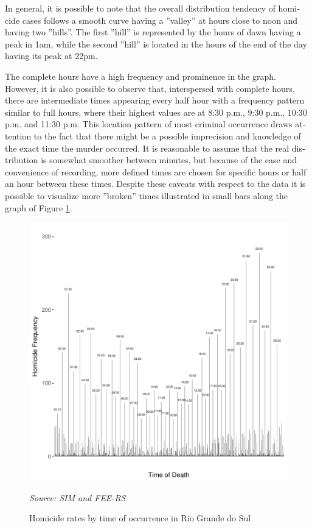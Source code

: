 \documentclass[12pt,openright,oneside,a4paper,english,french,spanish]{abntex2}
\numberwithin{table}{section} %
\numberwithin{figure}{section} %
\newcommand{\source}[1]{\textit{#1}}
\begin{document}
\begin{otherlanguage}{english}
In general, it is possible to note that the overall distribution tendency of homicide cases follows a smooth curve having a ''valley'' at hours close to noon and having two ''hills''. The first ''hill'' is represented by the hours of dawn having a peak in 1am, while the second ''hill'' is located in the hours of the end of the day having its peak at 22pm.

The complete hours have a high frequency and prominence in the graph. However, it is also possible to observe that, interspersed with complete hours, there are intermediate times appearing every half hour with a frequency pattern similar to full hours, where their highest values are at 8:30 p.m., 9:30 p.m., 10:30 p.m. and 11:30 p.m. This location pattern of most criminal occurrence draws attention to the fact that there might be a possible imprecision and knowledge of the exact time the murder occurred. It is reasonable to assume that the real distribution is somewhat smoother between minutes, but because of the ease and convenience of recording, more defined times are chosen for specific hours or half an hour between these times. Despite these caveats with respect to the data it is possible to visualize more ''broken'' times illustrated in small bars along the graph of Figure \ref{fig:horarios}.


\begin{figure}[H]
\begin{center}
\includegraphics{TESE_DE_DOUTORADO_RENAN_FINAL-plot4_HV}
\end{center}
\caption{Homicide rates by time of occurrence in Rio Grande do Sul}
\source{Source: SIM and FEE-RS}
\label{fig:horarios}
\end{figure}


\end{otherlanguage}
\end{document}
